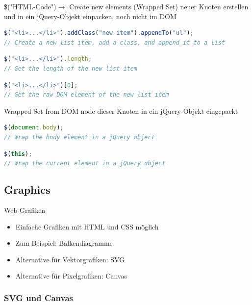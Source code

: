 \begin{definition}{\$("HTML-Code")}$\rightarrow$ Create new elements (Wrapped Set)
  neuer Knoten erstellen und in ein jQuery-Objekt einpacken, noch nicht im DOM
\begin{lstlisting}[language=JavaScript, style=basesmol]
$("<li>...</li>").addClass("new-item").appendTo("ul");
// Create a new list item, add a class, and append it to a list
\end{lstlisting}
\begin{lstlisting}[language=JavaScript, style=basesmol]
$("<li>...</li>").length;
// Get the length of the new list item
\end{lstlisting}
\begin{lstlisting}[language=JavaScript, style=basesmol]
$("<li>...</li>")[0];
// Get the raw DOM element of the new list item
\end{lstlisting}
\end{definition}

\begin{definition}{Wrapped Set from DOM node}
  dieser Knoten in ein jQuery-Objekt eingepackt
\begin{lstlisting}[language=JavaScript, style=basesmol]
$(document.body);
// Wrap the body element in a jQuery object
\end{lstlisting}
\begin{lstlisting}[language=JavaScript, style=basesmol]
$(this);
// Wrap the current element in a jQuery object
\end{lstlisting}
\end{definition}

\pagebreak

\subsection{Graphics}

\begin{definition}{Web-Grafiken}
\begin{itemize}
  \item Einfache Grafiken mit HTML und CSS möglich
  \item Zum Beispiel: Balkendiagramme
  \item Alternative für Vektorgrafiken: SVG
  \item Alternative für Pixelgrafiken: Canvas
\end{itemize}
\end{definition}

\subsubsection{SVG und Canvas}

